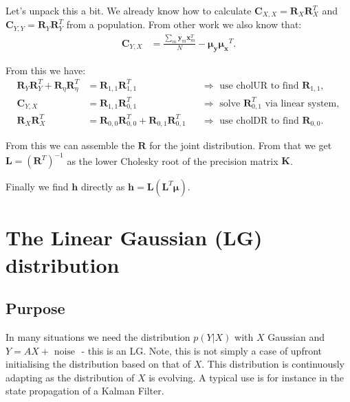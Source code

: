 \documentclass[oneside,english]{scrbook}
\begin{document}
Let's unpack this a bit. We already know how to calculate
$\bm{C}_{X,X} = \bm{R}_X \bm{R}^T_X$ and $\bm{C}_{Y,Y} = \bm{R}_Y
\bm{R}^T_Y$ from a population. From other work we also know that:
\begin{align*}
\bm{C}_{Y,X} &=  \frac{\sum_{m}\mathbf{y}_{m}\mathbf{x}_{m}^{T}}{N} - \mathbf{\mu_{y}}\mathbf{\mu_{x}}^{T}.
\end{align*}

From this we have:
\begin{align*}
  \bm{R}_Y \bm{R}^T_Y + \bm{R}_\eta \bm{R}^T_\eta
  &= \bm{R}_{1,1}\bm{R}_{1,1}^T
  && \Longrightarrow \text{ use cholUR to find $\bm{R}_{1,1}$},\\
  \bm{C}_{Y,X} &= \bm{R}_{1,1}\bm{R}_{0,1}^T
  && \Longrightarrow \text{ solve $\bm{R}_{0,1}^T$ via linear system},\\
  \bm{R}_X \bm{R}^T_X
  &= \bm{R}_{0,0}\bm{R}_{0,0}^T+ \bm{R}_{0,1}\bm{R}_{0,1}^T
  && \Longrightarrow \text{ use cholDR to find $\bm{R}_{0,0}$}.
\end{align*}

From this we can assemble the $\bm{R}$ for the joint distribution. From that we get $\bm{L} = (\bm{R}^{T})^{-1}$ as the lower Cholesky root of the precision matrix $\bm{K}$.

Finally we find $\bm{h}$ directly as $\bm{h} = \bm{L}(\bm{L}^{T}\bm{\mu})$.



\chapter{The Linear Gaussian (LG) distribution}

\section{Purpose}
In many situations we need the distribution $p(Y|X)$ with $X$ Gaussian
and $Y = AX+\text{ noise }$ - this is an LG. Note, this is not simply
a case of upfront initialising the distribution based on that of
$X$. This distribution is continuously adapting as the distribution of
$X$ is evolving.  A typical use is for instance in the state propagation
of a Kalman Filter.
\end{document}
